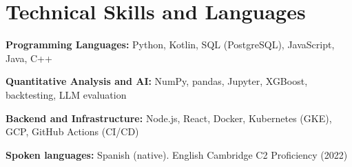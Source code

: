 \documentclass[10pt,letterpaper]{article}
\newenvironment{cvblock}{%
  \begin{list}{}{%
    \setlength{\leftmargin}{10.8pt}%
    \setlength{\rightmargin}{5.4pt}%
    \setlength{\topsep}{0pt}%
    \setlength{\partopsep}{0pt}%
    \setlength{\parsep}{0pt}%
    \setlength{\itemsep}{0pt}%
  }\item[]%
}{\end{list}}
\begin{document}
\section{Technical Skills and Languages}
\begin{cvblock}
  \textbf{Programming Languages:} Python, Kotlin, SQL (PostgreSQL), JavaScript, Java, C++\par
  \textbf{Quantitative Analysis and AI:} NumPy, pandas, Jupyter, XGBoost, backtesting, LLM evaluation\par
  \textbf{Backend and Infrastructure:} Node.js, React, Docker, Kubernetes (GKE), GCP, GitHub Actions (CI/CD)\par
  \textbf{Spoken languages:} Spanish (native). English Cambridge C2 Proficiency (2022)
\end{cvblock}
\end{document}
